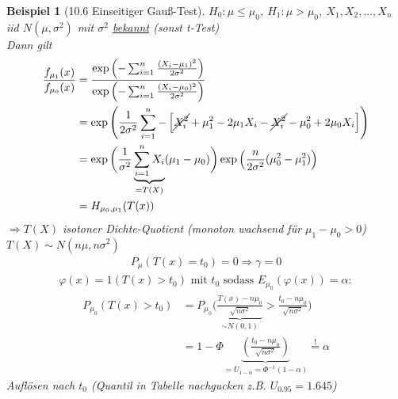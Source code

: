 \documentclass[a4paper,openany]{book}
\theoremstyle{mytheoremstyle}
\newtheorem*{bei}{Beispiel}
\theoremstyle{mytheoremstyle2}
\begin{document}
\begin{bei}[10.6 Einseitiger Gauß-Test]
  $H_0:\mu \leq \mu _0$, $H_1:\mu >\mu _0$, $X_1,X_2,...,X_n $ iid $N(\mu ,\sigma ^2)$ mit $\sigma ^2$ \underline{bekannt} (sonst t-Test)\\
  Dann gilt 
  \begin{align*}
    \frac{f _{\mu _1}(x)}{f _{\mu _0}(x)}
    &=\frac{\exp \left(-\sum_{i=1}^{n}{\frac{(X_i-\mu _1)^2}{2 \sigma ^2}}\right)}{\exp \left(-\sum_{i=1}^{n}{\frac{(X_i-\mu _0)^2}{2 \sigma ^2}}\right)}\\
    &=\exp \left(\frac{1}{2 \sigma ^2}\sum_{i=1}^{n}{-\left[\cancel{X_i^2}+\mu _1^2-2 \mu _1X_i-\cancel{X_i^2}-\mu _0^2+2 \mu _0X_i\right]}\right)\\
    &=\exp \bigg(\frac{1}{ \sigma ^2}\underbrace{\sum_{i=1}^{n}{X_i}}_{=T(X)}(\mu _1-\mu _0)\bigg)\exp \left(\frac{n}{2 \sigma ^2}(\mu _0^2-\mu _1^2)\right) \\
    &=H _{\mu _0,\mu _1}(T(x))
  \end{align*}
  $\Rightarrow  T(X)$ isotoner Dichte-Quotient (monoton wachsend für $\mu _1-\mu _0>0$)\\
  $T(X)\sim N \left(n  \mu ,n  \sigma ^2\right)$  
  \begin{align*}
    P _{\mu }(T(x)=t_0)=0 \Rightarrow \gamma =0
  \end{align*}
  \begin{align*}
    \varphi (x)=1(T(x)>t_0)\text{ mit }t_0 \text{ sodass }E _{\mu _0}(\varphi (x))=\alpha :
  \end{align*}
  \begin{align*}
    P _{\mu _0}(T(x)>t_0)
    &=P _{\mu _0}\bigg(\underbrace{\frac{T(x)-n\mu _0}{\sqrt{n \sigma ^2}}}_{\sim N(0,1)}>\frac{t_0-n \mu _0}{\sqrt{n \sigma ^2}}\bigg) \\
    &=1-\Phi \underbrace{\left(\frac{t_0-n \mu _0}{\sqrt{n \sigma ^2}}\right)}_{=U _{1-\alpha }=\Phi ^{-1}(1-\alpha )}\overset{!}=\alpha 
  \end{align*}
  Auflösen nach $t_0$ (Quantil in Tabelle nachgucken z.B. $U _{0.95}=1.645$) 
\end{bei}
\end{document}
